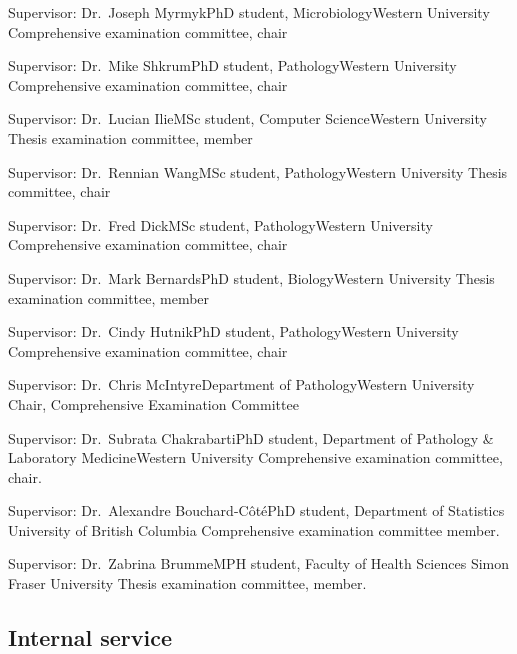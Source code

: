 {Supervisor: Dr.~Joseph Myrmyk}{PhD student, Microbiology}{Western University}
{Comprehensive examination committee, chair}

{Supervisor: Dr.~Mike Shkrum}{PhD student, Pathology}{Western University}
{Comprehensive examination committee, chair}

{Supervisor: Dr.~Lucian Ilie}{MSc student, Computer Science}{Western University}
{Thesis examination committee, member}


{Supervisor: Dr.~Rennian Wang}{MSc student, Pathology}{Western University}
{Thesis committee, chair}

{Supervisor: Dr.~Fred Dick}{MSc student, Pathology}{Western University}
{Comprehensive examination committee, chair}

{Supervisor: Dr.~Mark Bernards}{PhD student, Biology}{Western University}
{Thesis examination committee, member}

{Supervisor: Dr.~Cindy Hutnik}{PhD student, Pathology}{Western University}
{Comprehensive examination committee, chair}



{Supervisor: Dr.~Chris McIntyre}{Department of Pathology}{Western University}
{Chair, Comprehensive Examination Committee}


{Supervisor: Dr.~Subrata Chakrabarti}{PhD student, Department of Pathology \& Laboratory Medicine}{Western University}
{Comprehensive examination committee, chair.}


{Supervisor: Dr.~Alexandre Bouchard-C\^ot\'e}{PhD student, Department of Statistics}
{University of British Columbia}
{Comprehensive examination committee member.}

{Supervisor: Dr.~Zabrina Brumme}{MPH student, Faculty of Health Sciences}
{Simon Fraser University}
{Thesis examination committee, member.}



\subsection {Internal service}



